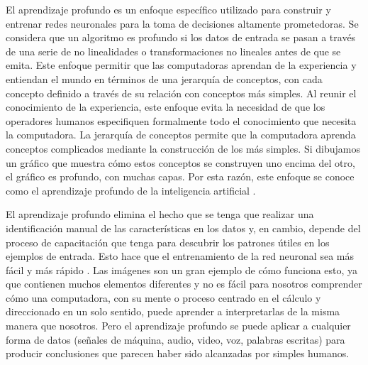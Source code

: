 	
	El aprendizaje profundo es un enfoque específico utilizado para construir y entrenar redes neuronales para la toma de decisiones altamente prometedoras. Se considera que un algoritmo es profundo si los datos de entrada se pasan a través de una serie de no linealidades o transformaciones no lineales antes de que se emita. Este enfoque permitir que las computadoras aprendan de la experiencia y entiendan el mundo en términos de una jerarquía de conceptos, con cada concepto definido a través de su relación con conceptos más simples. Al reunir el conocimiento de la experiencia, este enfoque evita la necesidad de que los operadores humanos especifiquen formalmente todo el conocimiento que necesita la computadora. La jerarquía de conceptos permite que la computadora aprenda conceptos complicados mediante la construcción de los más simples. Si dibujamos un gráfico que muestra cómo estos conceptos se construyen uno encima del otro, el gráfico es profundo, con muchas capas. Por esta razón, este enfoque se conoce como el aprendizaje profundo de la inteligencia artificial \citep{Goodfellow-et-al-2016}.

	
	El aprendizaje profundo elimina el hecho que se tenga que realizar una identificación manual de las características en los datos y, en cambio, depende del proceso de capacitación que tenga para descubrir los patrones útiles en los ejemplos de entrada. Esto hace que el entrenamiento de la red neuronal sea más fácil y más rápido \citep{Goodfellow-et-al-2016}. Las imágenes son un gran ejemplo de cómo funciona esto, ya que contienen muchos elementos diferentes y no es fácil para nosotros comprender cómo una computadora, con su mente o proceso centrado en el cálculo y direccionado en un solo sentido, puede aprender a interpretarlas de la misma manera que nosotros. Pero el aprendizaje profundo se puede aplicar a cualquier forma de datos (señales de máquina, audio, video, voz, palabras escritas) para producir conclusiones que parecen haber sido alcanzadas por simples humanos.

